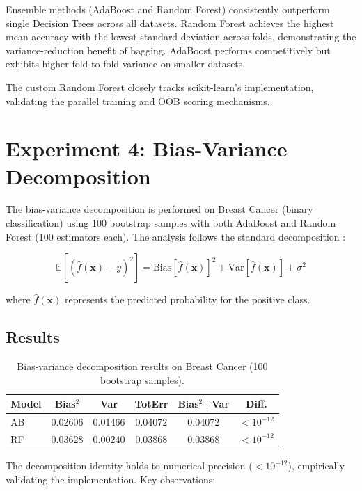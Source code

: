 \documentclass[conference,12pt]{IEEEtran}
\begin{document}
Ensemble methods (AdaBoost and Random Forest) consistently outperform single Decision Trees across all datasets. Random Forest achieves the highest mean accuracy with the lowest standard deviation across folds, demonstrating the variance-reduction benefit of bagging. AdaBoost performs competitively but exhibits higher fold-to-fold variance on smaller datasets.

The custom Random Forest closely tracks scikit-learn's implementation, validating the parallel training and OOB scoring mechanisms.

\section{Experiment 4: Bias-Variance Decomposition}

The bias-variance decomposition is performed on Breast Cancer (binary classification) using 100 bootstrap samples with both AdaBoost and Random Forest (100 estimators each). The analysis follows the standard decomposition \cite{hastie2009elements}:

\begin{equation}
\mathbb{E}[( \hat{f}(\mathbf{x}) - y)^2] = \text{Bias}[\hat{f}(\mathbf{x})]^2 + \text{Var}[\hat{f}(\mathbf{x})] + \sigma^2
\end{equation}

where $\hat{f}(\mathbf{x})$ represents the predicted probability for the positive class.

\subsection{Results}

\begin{table}[h]
\centering
\caption{Bias-variance decomposition results on Breast Cancer (100 bootstrap samples).}
\label{tab:biasvar}
\small
\begin{tabular}{lccccc}
\toprule
Model & Bias$^2$ &Var & TotErr & Bias$^2$+Var & Diff. \\
\midrule
AB & 0.02606 & 0.01466 & 0.04072 & 0.04072 & $<10^{-12}$ \\
RF & 0.03628 & 0.00240 & 0.03868 & 0.03868 & $<10^{-12}$ \\
\bottomrule
\end{tabular}
\end{table}

The decomposition identity holds to numerical precision ($<10^{-12}$), empirically validating the implementation. Key observations:
\end{document}
